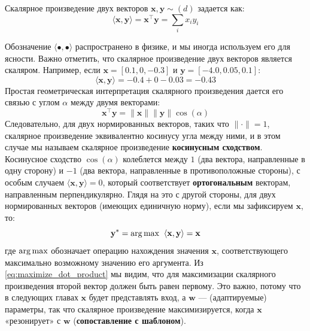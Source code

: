 \begin{definition}   \addbottle
    Скалярное произведение двух векторов $\mathbf{x}, \mathbf{y} \sim (d)$ задается как:
    \begin{equation}
            \langle \mathbf{x},\mathbf{y}\rangle=\mathbf{x}^\top\mathbf{y}=\sum_ix_iy_i
    \end{equation}
\end{definition}
%
Обозначение $\langle \bullet, \bullet \rangle$ распространено в физике, и мы иногда используем его для ясности. Важно отметить, что скалярное произведение двух векторов является скаляром. Например, если $\mathbf{x} = [0.1, 0, -0.3]$ и $\mathbf{y}=[-4.0, 0.05, 0.1]$:
%
\begin{equation*}
    \langle \mathbf{x}, \mathbf{y} \rangle = - 0.4 + 0 - 0.03 = - 0.43
\end{equation*}
%
Простая геометрическая интерпретация скалярного произведения дается его связью с углом $\alpha$ между двумя векторами:
%
\begin{equation}
    \mathbf{x}^\top\mathbf{y}=\lVert\mathbf{x}\rVert \lVert\mathbf{y}\rVert\cos(\alpha)
     \label{eq:dot_product_cosine}
\end{equation}
%
Следовательно, для двух нормированных векторов, таких что $\lVert \cdot \rVert = 1$, скалярное произведение эквивалентно косинусу угла между ними, и в этом случае мы называем скалярное произведение \textbf{косинусным сходством}. Косинусное сходство $\cos(\alpha)$ колеблется между $1$ (два вектора, направленные в одну сторону) и $-1$ (два вектора, направленные в противоположные стороны), с особым случаем $\langle \mathbf{x}, \mathbf{y} \rangle=0$, который соответствует \textbf{ортогональным} векторам, направленным перпендикулярно. Глядя на это с другой стороны, для двух нормированных векторов (имеющих единичную норму), если мы зафиксируем $\mathbf{x}$, то:
%
\begin{equation}
    \mathbf{y}^* = \operatorname*{arg\,max} \;\; \langle \mathbf{x}, \mathbf{y} \rangle = \mathbf{x}
    \label{eq:maximize_dot_product}
\end{equation}
%
где $\operatorname*{arg\,max}$ обозначает операцию нахождения значения $\mathbf{x}$, соответствующего максимально возможному значению его аргумента. Из \eqref{eq:maximize_dot_product} мы видим, что для максимизации скалярного произведения второй вектор должен быть равен первому. Это важно, потому что в следующих главах $\mathbf{x}$ будет представлять вход, а $\mathbf{w}$ — (адаптируемые) параметры, так что скалярное произведение максимизируется, когда $\mathbf{x}$ «резонирует» с $\mathbf{w}$ (\textbf{сопоставление с шаблоном}).

